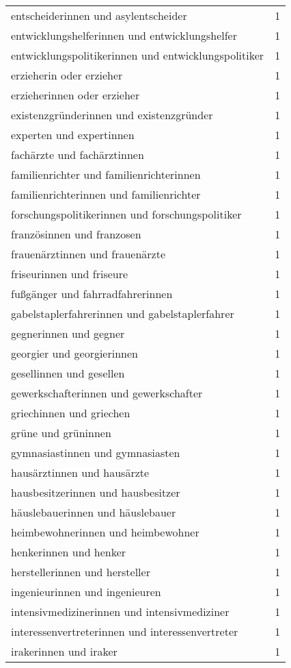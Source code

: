 \begin{tabular}{ll}
entscheiderinnen und asylentscheider & 1\\
entwicklungshelferinnen und entwicklungshelfer & 1\\
entwicklungspolitikerinnen und entwicklungspolitiker & 1\\
erzieherin oder erzieher & 1\\
erzieherinnen oder erzieher & 1\\
existenzgründerinnen und existenzgründer & 1\\
experten und expertinnen & 1\\
fachärzte und fachärztinnen & 1\\
familienrichter und familienrichterinnen & 1\\
familienrichterinnen und familienrichter & 1\\
forschungspolitikerinnen und forschungspolitiker & 1\\
französinnen und franzosen & 1\\
frauenärztinnen und frauenärzte & 1\\
friseurinnen und friseure & 1\\
fußgänger und fahrradfahrerinnen & 1\\
gabelstaplerfahrerinnen und gabelstaplerfahrer & 1\\
gegnerinnen und gegner & 1\\
georgier und georgierinnen & 1\\
gesellinnen und gesellen & 1\\
gewerkschafterinnen und gewerkschafter & 1\\
griechinnen und griechen & 1\\
grüne und grüninnen & 1\\
gymnasiastinnen und gymnasiasten & 1\\
hausärztinnen und hausärzte & 1\\
hausbesitzerinnen und hausbesitzer & 1\\
häuslebauerinnen und häuslebauer & 1\\
heimbewohnerinnen und heimbewohner & 1\\
henkerinnen und henker & 1\\
herstellerinnen und hersteller & 1\\
ingenieurinnen und ingenieuren & 1\\
intensivmedizinerinnen und intensivmediziner & 1\\
interessenvertreterinnen und interessenvertreter & 1\\
irakerinnen und iraker & 1\\

\end{tabular}
